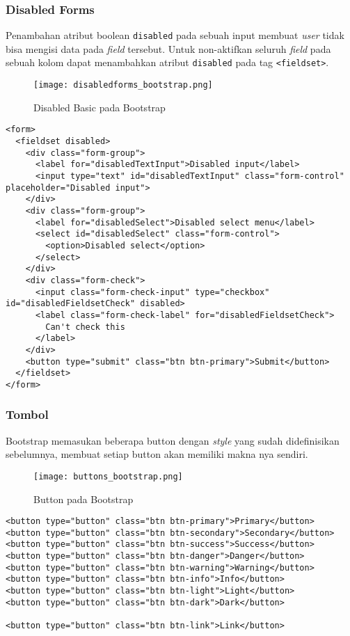 \subsubsection{Disabled Forms}
Penambahan atribut boolean \texttt{disabled} pada sebuah input membuat \textit{user} tidak bisa mengisi data pada \textit{field} tersebut. Untuk non-aktifkan seluruh \textit{field} pada sebuah kolom dapat menambahkan atribut \texttt{disabled} pada tag \texttt{<fieldset>}.
\begin{figure} [H]
	\centering  
	\texttt{[image: disabledforms\_bootstrap.png]}  
	\caption{Disabled Basic pada Bootstrap} 
\end{figure}
\begin{lstlisting}[frame=single, basicstyle=\tiny] 
<form>
  <fieldset disabled>
    <div class="form-group">
      <label for="disabledTextInput">Disabled input</label>
      <input type="text" id="disabledTextInput" class="form-control" placeholder="Disabled input">
    </div>
    <div class="form-group">
      <label for="disabledSelect">Disabled select menu</label>
      <select id="disabledSelect" class="form-control">
        <option>Disabled select</option>
      </select>
    </div>
    <div class="form-check">
      <input class="form-check-input" type="checkbox" id="disabledFieldsetCheck" disabled>
      <label class="form-check-label" for="disabledFieldsetCheck">
        Can't check this
      </label>
    </div>
    <button type="submit" class="btn btn-primary">Submit</button>
  </fieldset>
</form>
\end{lstlisting}
\subsubsection{Tombol}
Bootstrap memasukan beberapa button dengan \textit{style} yang sudah didefinisikan sebelumnya, membuat setiap button akan memiliki makna nya sendiri.
\begin{figure} [H]
	\centering  
	\texttt{[image: buttons\_bootstrap.png]}  
	\caption{Button pada Bootstrap} 
\end{figure}
\begin{lstlisting}[frame=single] 
<button type="button" class="btn btn-primary">Primary</button>
<button type="button" class="btn btn-secondary">Secondary</button>
<button type="button" class="btn btn-success">Success</button>
<button type="button" class="btn btn-danger">Danger</button>
<button type="button" class="btn btn-warning">Warning</button>
<button type="button" class="btn btn-info">Info</button>
<button type="button" class="btn btn-light">Light</button>
<button type="button" class="btn btn-dark">Dark</button>

<button type="button" class="btn btn-link">Link</button>
\end{lstlisting}
